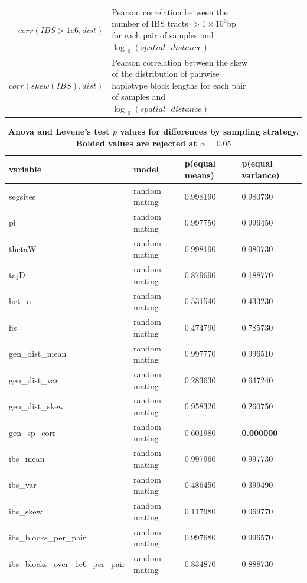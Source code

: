 \documentclass[11pt,twoside,lineno]{preprint}
\begin{document}
\begin{table}
\begin{tabular}{rllrrrrr}
$corr(IBS>1e6,dist)$ & \makecell[l]{Pearson correlation between the number of IBS tracts $> 1\times10^6$bp \\for each pair of samples and $\log_{10}(spatial\text{ }distance)$} \\
$corr(skew(IBS),dist)$ & \makecell[l]{Pearson correlation between the skew of the distribution of pairwise haplotype\\ block lengths for each pair of samples and $\log_{10}(spatial\text{ }distance)$} \\
\end{tabular}
\label{table:sumstats}
\end{table}


\begin{table}[htbp]
\tiny
\centering
\caption{\bf Anova and Levene's test $p$ values for differences by sampling strategy. Bolded values are rejected at $\alpha=0.05$}
\begin{tableminipage}{\textwidth}
\begin{tabularx}{\textwidth}{XXXX}
  \hline
 variable & model & p(equal means) & p(equal variance) \\ 
  \hline
segsites & random mating & 0.998190 & 0.980730 \\ 
pi & random mating & 0.997750 & 0.996450 \\ 
thetaW & random mating & 0.998190 & 0.980730 \\ 
tajD & random mating & 0.879690 & 0.188770 \\ 
het\_o & random mating & 0.531540 & 0.433230 \\ 
fis & random mating & 0.474790 & 0.785730 \\ 
gen\_dist\_mean & random mating & 0.997770 & 0.996510 \\ 
gen\_dist\_var & random mating & 0.283630 & 0.647240 \\ 
gen\_dist\_skew & random mating & 0.958320 & 0.260750 \\ 
gen\_sp\_corr & random mating & 0.601980 &\textbf{0.000000} \\ 
ibs\_mean & random mating & 0.997960 & 0.997730 \\ 
ibs\_var & random mating & 0.486450 & 0.399490 \\ 
ibs\_skew & random mating & 0.117980 & 0.069770 \\ 
ibs\_blocks\_per\_pair & random mating & 0.997680 & 0.996570 \\ 
ibs\_blocks\_over\_1e6\_per\_pair & random mating & 0.834870 & 0.888730 \\ 

\end{tabularx}
\end{tableminipage}
\end{table}
\end{document}
